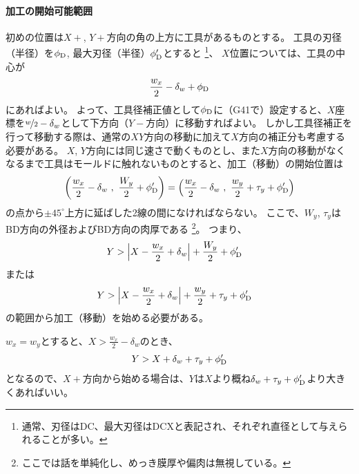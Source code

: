 \paragraph{加工の開始可能範囲}\noindent
初めの位置は$X+$, $Y+$方向の角の上方に工具があるものとする。
工具の刃径（半径）を$\phi_\text D$, 最大刃径（半径）$\phi'_\text D$とすると
\footnote{通常、刃径はDC、最大刃径はDCXと表記され、それぞれ直径として与えられることが多い。}、
$X$位置については、工具の中心が
\begin{align*}
  \frac{w_x}2-\delta_w+\phi_\text D
\end{align*}
にあればよい。
よって、工具径補正値として$\phi_\text D$に（G41で）設定すると、$X$座標を$\nicefrac w2-\delta_w$として下方向（$Y-$方向）に移動すればよい。
しかし工具径補正を行って移動する際は、通常の$XY$方向の移動に加えて$X$方向の補正分も考慮する必要がある。
$X$, $Y$方向には同じ速さで動くものとし、また$X$方向の移動がなくなるまで工具はモールドに触れないものとすると、加工（移動）の開始位置は
\begin{align*}
  \left(\frac{w_x}2-\delta_w~,~\frac{W_y}2+\phi'_\text D\right)
  = \left(\frac{w_x}2-\delta_w~,~\frac{w_y}2+\tau_y+\phi'_\text D\right)
\end{align*}
の点から$\pm45^\circ$上方に延ばした2線の間になければならない。
ここで、$W_y$, $\tau_y$はBD方向の外径およびBD方向の肉厚である
\footnote{ここでは話を単純化し、めっき膜厚や偏肉は無視している。}。
つまり、
\begin{align*}
  Y &> \left|X-\frac{w_x}2+\delta_w\right|+\frac{W_y}2+\phi'_\text D
\end{align*}
または
\begin{align*}
  Y &> \left|X-\frac{w_x}2+\delta_w\right|+\frac{w_y}2+\tau_y+\phi'_\text D
\end{align*}
の範囲から加工（移動）を始める必要がある。
\begin{hosokubox}
$w_x = w_y$とすると、$X > \frac{w_x}2-\delta_w$のとき、
\begin{align*}
  Y > X+\delta_w+\tau_y+\phi'_\text D
\end{align*}
となるので、$X+$方向から始める場合は、$Y$は$X$より概ね$\delta_w+\tau_y+\phi'_\text D$より大きくあればいい。
\end{hosokubox}





